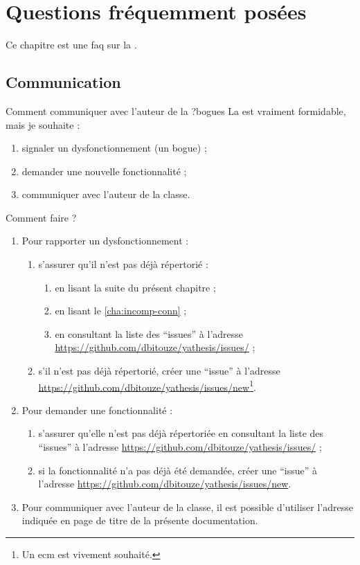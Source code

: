 \chapter{Questions fréquemment posées}\label{cha:faq}

Ce chapitre est une \gls{faq}  sur la \yatcl{}.

\section{Communication}
\label{sec:communication}

\begin{dbfaq}{Comment communiquer avec l'auteur de la \yatcl{} ?}{bogues}
  La \yatcl{} est vraiment formidable, mais je souhaite :
  \begin{enumerate}
  \item signaler un dysfonctionnement (un bogue) ;
  \item demander une nouvelle fonctionnalité ;
  \item communiquer avec l'auteur de la classe.
  \end{enumerate}
  Comment faire ?
  \tcblower
  \begin{enumerate}
  \item Pour rapporter un dysfonctionnement :
    \begin{enumerate}
    \item s'assurer qu'il n'est pas déjà répertorié :
      \begin{enumerate}
      \item en lisant la suite du présent chapitre ;
      \item en lisant le \vref{cha:incomp-conn} ;
      \item en consultant la liste des \enquote{issues} à l'adresse
        \url{https://github.com/dbitouze/yathesis/issues/} ;
      \end{enumerate}
    \item s'il n'est pas déjà répertorié, créer une \enquote{issue} à l'adresse
      \url{https://github.com/dbitouze/yathesis/issues/new}\footnote{Un
        \gls{ecm} est vivement souhaité.}.
    \end{enumerate}
  \item Pour demander une fonctionnalité :
    \begin{enumerate}
    \item s'assurer qu'elle n'est pas déjà répertoriée en
      consultant la liste des \enquote{issues} à l'adresse
      \url{https://github.com/dbitouze/yathesis/issues/} ;
    \item si la fonctionnalité n'a pas déjà été demandée, créer une
      \enquote{issue} à l'adresse
      \url{https://github.com/dbitouze/yathesis/issues/new}.
    \end{enumerate}
  \item Pour communiquer avec l'auteur de la classe, il est possible d'utiliser
    l'adresse indiquée en page de titre de la présente documentation.
  \end{enumerate}
\end{dbfaq}

